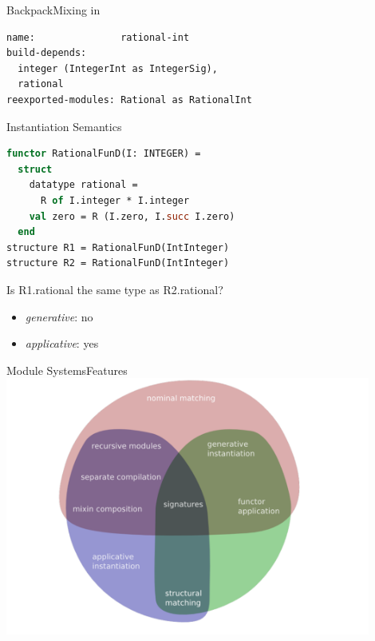 \documentclass{beamer}
\begin{document}
\begin{frame}[fragile]{Backpack}{Mixing in}
\begin{lstlisting}[language=Cabal,title=Rationals based on Integers]
name:               rational-int
build-depends:
  integer (IntegerInt as IntegerSig),
  rational
reexported-modules: Rational as RationalInt
\end{lstlisting}
\end{frame}

\begin{frame}[fragile]{Instantiation Semantics}
\begin{lstlisting}[language=ML]
functor RationalFunD(I: INTEGER) =
  struct
    datatype rational =
      R of I.integer * I.integer
    val zero = R (I.zero, I.succ I.zero)
  end
structure R1 = RationalFunD(IntInteger)
structure R2 = RationalFunD(IntInteger)
\end{lstlisting}
Is R1.rational the same type as R2.rational?
\begin{itemize}
\item \textit{generative}: no
\item \textit{applicative}: yes
\end{itemize}
\end{frame}

\begin{frame}[fragile]{Module Systems}{Features}
\includegraphics[width=12cm]{features.pdf}
\end{frame}
\end{document}
